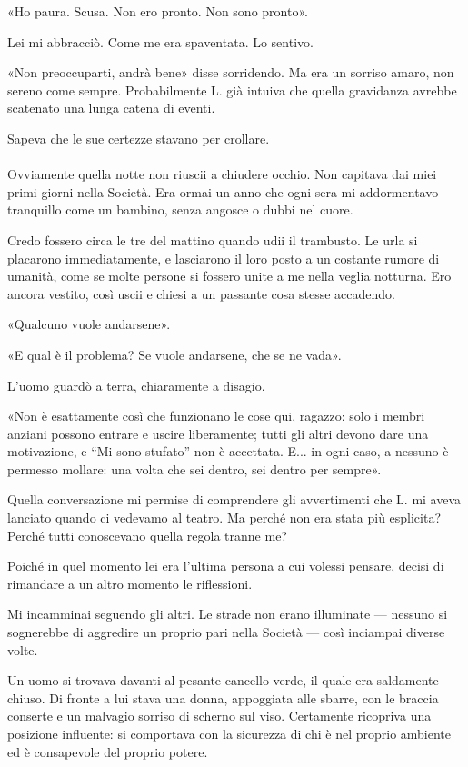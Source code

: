 \documentclass[a4paper,12pt]{book}
\begin{document}
«Ho paura. Scusa. Non ero pronto. Non sono pronto».

Lei mi abbracciò. Come me era spaventata. Lo sentivo.

«Non preoccuparti, andrà bene» disse sorridendo. Ma era un sorriso amaro, non
sereno come sempre. Probabilmente L. già intuiva che quella gravidanza avrebbe
scatenato una lunga catena di eventi.

Sapeva che le sue certezze stavano per crollare.

\paragraph{}
Ovviamente quella notte non riuscii a chiudere occhio. Non capitava dai miei
primi giorni nella Società. Era ormai un anno che ogni sera mi addormentavo
tranquillo come un bambino, senza angosce o dubbi nel cuore.

Credo fossero circa le tre del mattino quando udii il trambusto. Le urla si
placarono immediatamente, e lasciarono il loro posto a un costante rumore di
umanità, come se molte persone si fossero unite a me nella veglia notturna. Ero
ancora vestito, così uscii e chiesi a un passante cosa stesse accadendo.

«Qualcuno vuole andarsene».

«E qual è il problema? Se vuole andarsene, che se ne vada».

L'uomo guardò a terra, chiaramente a disagio.

«Non è esattamente così che funzionano le cose qui, ragazzo: solo i membri
anziani possono entrare e uscire liberamente; tutti gli altri devono dare una
motivazione, e ``Mi sono stufato'' non è accettata. E... in ogni caso, a nessuno
è permesso mollare: una volta che sei dentro, sei dentro per sempre».

Quella conversazione mi permise di comprendere gli avvertimenti che L. mi aveva
lanciato quando ci vedevamo al teatro. Ma perché non era stata più esplicita?
Perché tutti conoscevano quella regola tranne me?

Poiché in quel momento lei era l'ultima persona a cui volessi pensare, decisi di
rimandare a un altro momento le riflessioni.

Mi incamminai seguendo gli altri. Le strade non erano illuminate --- nessuno si
sognerebbe di aggredire un proprio pari nella Società --- così inciampai diverse
volte.

Un uomo si trovava davanti al pesante cancello verde, il quale era saldamente
chiuso. Di fronte a lui stava una donna, appoggiata alle sbarre, con le braccia
conserte e un malvagio sorriso di scherno sul viso. Certamente ricopriva una
posizione influente: si comportava con la sicurezza di chi è nel proprio
ambiente ed è consapevole del proprio potere.
\end{document}
